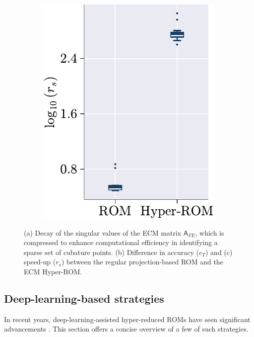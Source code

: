 \documentclass[11pt]{article}
\newcommand{\mat}[1]{\mathsf{#1}}
\begin{document}
\begin{figure}[t!]
\begin{subfigure}[b]{0.33\linewidth}
\includegraphics[height=1.3\linewidth]{speed_up_comp_rom_hrom_ecm.pdf}
\caption{}
\label{fig:HROM_ERROR_SPDUP__ecm_b}
\end{subfigure}
\caption{(a) Decay of the singular values of the ECM matrix \(\mat{A}_{FE}\), which is compressed to enhance computational efficiency in identifying a sparse set of cubature points. (b) Difference in accuracy (\(e_T\)) and (c) speed-up (\(r_s\)) between the regular projection-based ROM and the ECM Hyper-ROM.}
\label{fig:HROM_ERROR_SPDUP_ecm}
\end{figure}




\subsection{Deep-learning-based strategies}

In recent years, deep-learning-assisted hyper-reduced ROMs have seen significant advancements \cite{cicci2022deep-hyromneta,romor2025explicable}.
This section offers a concise overview of a few of such strategies.
\end{document}
